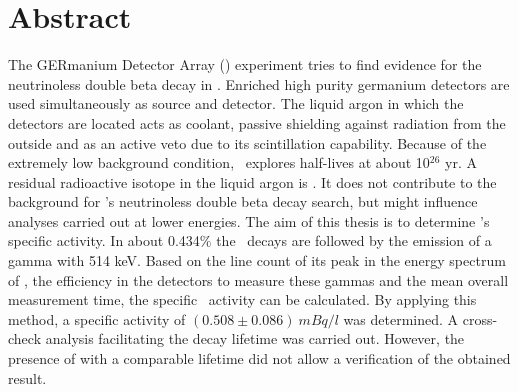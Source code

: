 \documentclass[encoding=utf8,british]{tumphthesis}
\begin{document}



\chapter*{Abstract}
The GERmanium Detector Array (\gerda) experiment tries to find evidence for the neutrinoless double beta decay in .
Enriched high purity germanium detectors are used simultaneously as source and detector.
The liquid argon in which the detectors are located acts as coolant, passive shielding against radiation from the outside and as an active veto due to its scintillation capability.
Because of the extremely low background condition, \gerda\ explores half-lives at about 10$^{26}$ yr.
A residual radioactive isotope in the liquid argon is .
It does not contribute to the background for \gerda's neutrinoless double beta decay search, but might influence analyses carried out at lower energies.
The aim of this thesis is to determine \Kr's specific activity.
In about 0.434$\%$ the \Kr\ decays are followed by the emission of a gamma with 514 keV.
Based on the line count of its peak in the energy spectrum of \gerda, the efficiency in the detectors to measure these gammas and the mean overall measurement time, the specific \Kr\ activity can be calculated.
By applying this method, a specific activity of $(0.508\pm0.086) \  \unit{mBq}/\unit{l}$ was determined.
A cross-check analysis facilitating the decay lifetime was carried out.
However, the presence of  with a comparable lifetime did not allow a verification of the obtained result.
\end{document}
